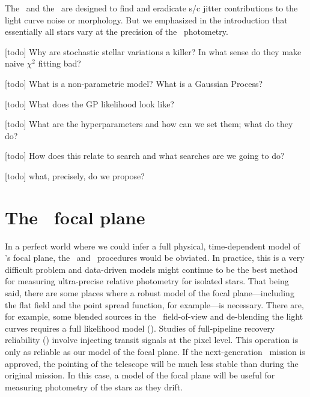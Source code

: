 \documentclass[letterpaper,12pt,preprint]{hack_aastex}
\begin{document}
The \PLM\ and the \OWL\ are designed to find and eradicate s/c jitter
contributions to the light curve noise or morphology.
But we emphasized in the introduction that essentially all stars vary at the
precision of the \Kepler\ photometry.


[todo] Why are stochastic stellar variations a killer?  In what sense do they make naive $\chi^2$ fitting bad?

[todo] What is a non-parametric model?  What is a Gaussian Process?

[todo] What does the GP likelihood look like?

[todo] What are the hyperparameters and how can we set them; what do they do?

[todo] How does this relate to search and what searches are we going to do?

[todo] what, precisely, do we propose?


\section{The \Kepler\ focal plane}

In a perfect world where we could infer a full physical, time-dependent model
of \Kepler's focal plane, the \PLM\ and \OWL\ procedures would be obviated.
In practice, this is a very difficult problem and data-driven models might
continue to be the best method for measuring ultra-precise relative photometry
for isolated stars.
That being said, there are some places where a robust model of the focal
plane---including the flat field and the point spread function, for
example---is necessary.
There are, for example, some blended sources in the \Kepler\ field-of-view and
de-blending the light curves requires a full likelihood model (\citealt{psf}).
Studies of full-pipeline recovery reliability (\citealt{inject}) involve
injecting transit signals at the pixel level.
This operation is only as reliable as our model of the focal plane.
If the next-generation \Kepler\ mission is approved, the pointing of the
telescope will be much less stable than during the original mission.
In this case, a model of the focal plane will be useful for measuring
photometry of the stars as they drift.
\end{document}
